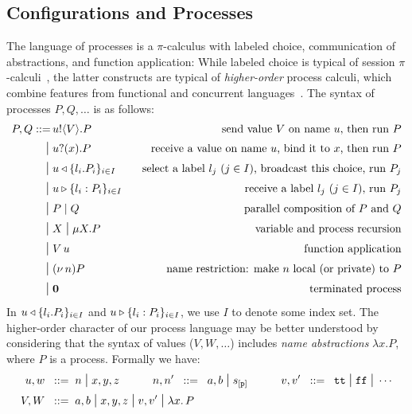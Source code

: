 \documentclass[runningheads,plain]{llncs}
\begin{document}
\subsection{Configurations and Processes}
\label{ss:processes}
The language  of processes   is a $\pi$-calculus with   labeled  choice, communication of abstractions, and function application:
While labeled choice is typical of session $\pi$-calculi~\cite{DBLP:conf/esop/HondaVK98}, the latter constructs are typical of \emph{higher-order} process calculi, which combine features from functional and concurrent  languages~\cite{DBLP:journals/tcs/Sangiorgi01}. 
The syntax of processes $P, Q, \ldots$ is as follows:
\begin{align*}
P, Q ::= \, 
        & u ! \langle V \rangle .{P} \,\,\, \, \, &\text{send value $V$ on name $u$, then run $P$} \\
\;\mbox{\large{$\mid$}}\; & u ? (x) .{P} \,\,\, \, \, & \text{receive a value on name $u$, bind it to $x$, then run $P$} \\
\;\mbox{\large{$\mid$}}\; &  u \triangleleft \{l_i. P_i\}_{i\in I}\,\,\, \, \, & \text{select a label $l_j$ ($j \in I$), broadcast this choice, run $P_j$} \\
\;\mbox{\large{$\mid$}}\; & u \triangleright \{l_i:P_i\}_{i \in I} \,\,\, \, \, & \text{receive a label  $l_j$ ($j \in I$), run  $P_j$} \\
\;\mbox{\large{$\mid$}}\;   & P \;|\; Q  &\text{parallel composition of $P$ and $Q$} \\
\;\mbox{\large{$\mid$}}\;  & X \;\mbox{\large{$\mid$}}\;  \mu X. P \,\,\, &\text{variable and process recursion}\\
\;\mbox{\large{$\mid$}}\; & V\, {u} \,\,\, &\text{function application} \\
\;\mbox{\large{$\mid$}}\;  & (\nu\, n)P \,\,\, &\text{name restriction: make $n$ local (or private) to $P$} \\
\;\mbox{\large{$\mid$}}\;  & \mathbf{0} \,\,\, &\text{terminated process}
\end{align*}
In $u \triangleleft \{l_i. P_i\}_{i\in I}$ and $u \triangleright \{l_i:P_i\}_{i \in I}$, we use $I$ to denote some index set. 
The higher-order character of our process language may be better understood by considering that the syntax of values ($V, W, \ldots$) includes 
\emph{name abstractions} $\lambda x. P$, where $P$ is a process. Formally we have: 
\begin{align*}
u,w  \;\;::=\;\;& n \;\mbox{\large{$\mid$}}\; x,y,z
\qquad \quad
n,n' \;\;::=\;\; a,b \;\mbox{\large{$\mid$}}\; s_{[\mathtt{p}]}
\qquad \quad
 {v},  {v}'  \;\;::=\;\;   \mathtt{tt} \;\mbox{\large{$\mid$}}\; \mathtt{ff} \;\mbox{\large{$\mid$}}\; \cdots
\\
V,W \;\;::=\;\; & {a,b} \;\mbox{\large{$\mid$}}\;  x,y,z \;\mbox{\large{$\mid$}}\;  v, v' \;\mbox{\large{$\mid$}}\; {\lambda x.\,P}
\end{align*}
\end{document}
